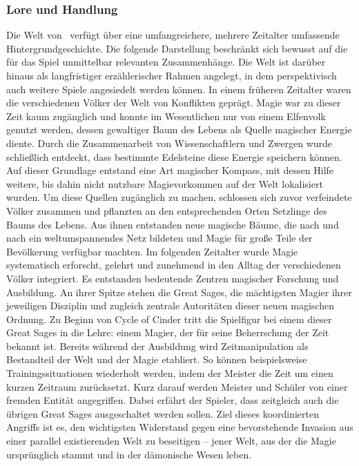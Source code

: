 \subsubsection{Lore und Handlung}
Die Welt von \coc\ verfügt über eine umfangreichere, mehrere Zeitalter umfassende Hintergrundgeschichte.
Die folgende Darstellung beschränkt sich bewusst auf die für das Spiel unmittelbar relevanten Zusammenhänge. Die Welt ist darüber hinaus als langfristiger erzählerischer Rahmen angelegt, in dem perspektivisch auch weitere Spiele angesiedelt werden können.
In einem früheren Zeitalter waren die verschiedenen Völker der Welt von Konflikten geprägt. Magie war zu dieser Zeit kaum zugänglich und konnte im Wesentlichen nur von einem Elfenvolk genutzt werden, dessen gewaltiger Baum des Lebens als Quelle magischer Energie diente. Durch die Zusammenarbeit von Wissenschaftlern und Zwergen wurde schließlich entdeckt, dass bestimmte Edelsteine diese Energie speichern können. Auf dieser Grundlage entstand eine Art magischer Kompass, mit dessen Hilfe weitere, bis dahin nicht nutzbare Magievorkommen auf der Welt lokalisiert wurden.
Um diese Quellen zugänglich zu machen, schlossen sich zuvor verfeindete Völker zusammen und pflanzten an den entsprechenden Orten Setzlinge des Baums des Lebens. Aus ihnen entstanden neue magische Bäume, die nach und nach ein weltumspannendes Netz bildeten und Magie für große Teile der Bevölkerung verfügbar machten.
Im folgenden Zeitalter wurde Magie systematisch erforscht, gelehrt und zunehmend in den Alltag der verschiedenen Völker integriert. Es entstanden bedeutende Zentren magischer Forschung und Ausbildung. An ihrer Spitze stehen die Great Sages, die mächtigsten Magier ihrer jeweiligen Disziplin und zugleich zentrale Autoritäten dieser neuen magischen Ordnung.
Zu Beginn von Cycle of Cinder tritt die Spielfigur bei einem dieser Great Sages in die Lehre: einem Magier, der für seine Beherrschung der Zeit bekannt ist. Bereits während der Ausbildung wird Zeitmanipulation als Bestandteil der Welt und der Magie etabliert. So können beispielsweise Trainingssituationen wiederholt werden, indem der Meister die Zeit um einen kurzen Zeitraum zurücksetzt.
Kurz darauf werden Meister und Schüler von einer fremden Entität angegriffen. Dabei erfährt der Spieler, dass zeitgleich auch die übrigen Great Sages ausgeschaltet werden sollen. Ziel dieses koordinierten Angriffs ist es, den wichtigsten Widerstand gegen eine bevorstehende Invasion aus einer parallel existierenden Welt zu beseitigen – jener Welt, aus der die Magie ursprünglich stammt und in der dämonische Wesen leben.
